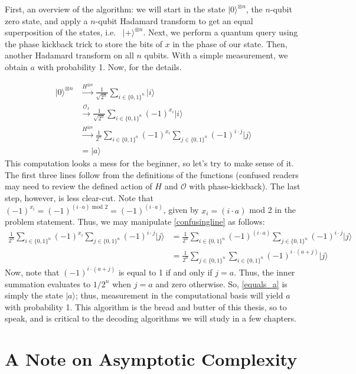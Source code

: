 \documentclass[12pt,twoside]{reedthesis}
\newcommand{\ketz}{\ensuremath{\lvert 0\rangle}\xspace}
\newcommand{\ket}[1]{\ensuremath{\lvert #1\rangle}\xspace}
\newcommand{\Hplus}{\ensuremath{\lvert + \rangle}\xspace}
\begin{document}
First, an overview of the algorithm: we will start in the state $\ketz^{\otimes n}$, the $n$-qubit zero state, and apply a $n$-qubit Hadamard transform to get an equal superposition of the states, i.e.~ $\Hplus^{\otimes n}$. Next, we perform a quantum query using the phase kickback trick to store the bits of $x$ in the phase of our state. Then, another Hadamard transform on all $n$ qubits. With a simple measurement, we obtain $a$ with probability 1. Now, for the details.

\begin{align}
 \ketz^{\otimes n}
& \xrightarrow{H^{\otimes n}}\frac{1}{\sqrt{2^n}} \sum_{i \in \{0,1\}^n} \ket{i} \\
& \xrightarrow{\mathcal{O}_x} \frac{1}{\sqrt{2^n}} \sum_{i \in \{0,1\}^n} (-1)^{x_i}\ket{i}\\
& \xrightarrow{H^{\otimes n}} \frac{1}{2^n} \sum_{i \in \{0,1\}^n} (-1)^{x_i} \sum_{j \in \{0,1\}^n} (-1)^{i \cdot j} \ket{j} \label{confusingline}\\
& = \ket{a}
\end{align}
This computation looks a mess for the beginner, so let's try to make sense of it. The first three lines follow from the definitions of the functions (confused readers may need to review the defined action of $H$ and $\mathcal{O}$ with phase-kickback). The last step, however, is less clear-cut. Note that $(-1)^{x_i} = (-1)^{(i \cdot a) \text{ mod } 2} = (-1)^{(i \cdot a)}$, given by $x_i = (i \cdot a)$ mod 2 in the problem statement. Thus, we may manipulate \ref{confusingline} as follows:
\begin{align}
 \frac{1}{2^n} \sum_{i \in \{0,1\}^n} (-1)^{x_i} \sum_{j \in \{0,1\}^n} (-1)^{i \cdot j} \ket{j}
& = \frac{1}{2^n} \sum_{i \in \{0,1\}^n} (-1)^{(i \cdot a)} \sum_{j \in \{0,1\}^n} (-1)^{i \cdot j} \ket{j} \\
& = \frac{1}{2^n}  \sum_{j \in \{0,1\}^n}\sum_{i \in \{0,1\}^n} (-1)^{i \cdot(a + j)}  \ket{j} \label{equals_a}
\end{align}
Now, note that $(-1)^{i \cdot(a + j)}$ is equal to 1 if and only if $j = a$. Thus, the inner summation evaluates to $1/2^n$ when $j =a$ and zero otherwise. So, \ref{equals_a} is simply the state $\ket{a}$; thus, measurement in the computational basis will yield $a$ with probability 1. This algorithm is the bread and butter of this thesis, so to speak, and is critical to the decoding algorithms we will study in a few chapters. 
\section{A Note on Asymptotic Complexity}
\end{document}
